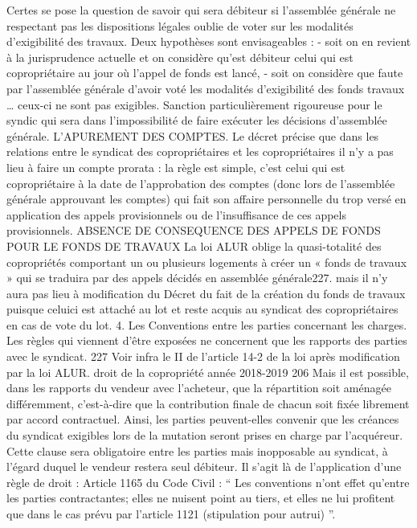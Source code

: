 	Certes se pose la question de savoir qui sera débiteur si l’assemblée générale ne respectant pas les
	dispositions légales oublie de voter sur les modalités d’exigibilité des travaux.
	Deux hypothèses sont envisageables :
	- soit on en revient à la jurisprudence actuelle et on considère qu’est débiteur celui
	qui est copropriétaire au jour où l’appel de fonds est lancé,
	- soit on considère que faute par l’assemblée générale d’avoir voté les modalités
	d’exigibilité des fonds travaux … ceux-ci ne sont pas exigibles. Sanction
	particulièrement rigoureuse pour le syndic qui sera dans l’impossibilité de faire
	exécuter les décisions d’assemblée générale.
	L’APUREMENT DES COMPTES.
	Le décret précise que dans les relations entre le syndicat des copropriétaires et les copropriétaires il n’y a
	pas lieu à faire un compte prorata : la règle est simple, c’est celui qui est copropriétaire à la date de
	l’approbation des comptes (donc lors de l’assemblée générale approuvant les comptes) qui fait son affaire
	personnelle du trop versé en application des appels provisionnels ou de l’insuffisance de ces appels
	provisionnels.
	ABSENCE DE CONSEQUENCE DES APPELS DE FONDS POUR LE FONDS DE TRAVAUX
	La loi ALUR oblige la quasi-totalité des copropriétés comportant un ou plusieurs logements à créer un
	« fonds de travaux » qui se traduira par des appels décidés en assemblée générale227.
	mais il n’y aura pas lieu à modification du Décret du fait de la création du fonds de travaux puisque celuici
	est attaché au lot et reste acquis au syndicat des copropriétaires en cas de vote du lot.
	4. Les Conventions entre les parties concernant les charges.
	Les règles qui viennent d'être exposées ne concernent que les rapports des parties avec le syndicat.
	227 Voir infra le II de l’article 14-2 de la loi après modification par la loi ALUR.
	droit de la copropriété année 2018-2019
	206
	Mais il est possible, dans les rapports du vendeur avec l'acheteur, que la répartition soit aménagée
	différemment, c'est-à-dire que la contribution finale de chacun soit fixée librement par accord contractuel.
	Ainsi, les parties peuvent-elles convenir que les créances du syndicat exigibles lors de la mutation seront
	prises en charge par l'acquéreur. Cette clause sera obligatoire entre les parties mais inopposable au
	syndicat, à l'égard duquel le vendeur restera seul débiteur.
	Il s’agit là de l’application d’une règle de droit :
	Article 1165 du Code Civil : “ Les conventions n’ont effet qu’entre les parties contractantes; elles ne nuisent point
	au tiers, et elles ne lui profitent que dans le cas prévu par l’article 1121 (stipulation pour autrui) ”.
